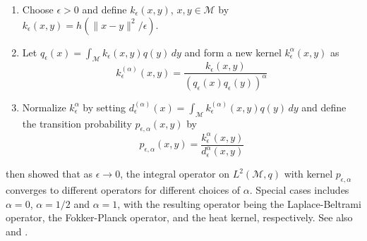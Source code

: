 \begin{enumerate}
\item Choose $\epsilon > 0$ and define $k_{\epsilon}(x,y)$, $x,y
  \in \mathcal{M}$ by $k_{\epsilon}(x,y) = h(\| x - y \|^2/\epsilon)$.
\item Let $q_{\epsilon}(x) = \int_{\mathcal{M}}{k_{\epsilon}(x,y) q(y)
    \,d y}$ and
  form a new kernel $k_{\epsilon}^{\alpha}(x,y)$ as
  \begin{equation}
    \label{eq:95}
    k_{\epsilon}^{(\alpha)}(x,y) =
    \frac{k_{\epsilon}(x,y)}{(q_{\epsilon}(x) q_{\epsilon}(y))^{\alpha}}
  \end{equation}
\item Normalize $k_{\epsilon}^{\alpha}$ by setting
  $d_{\epsilon}^{(\alpha)}(x) = \int_{\mathcal{M}}{k_{\epsilon}^{(\alpha)}(x,y) q(y)
    \, d y}$ and define the transition probability
    $p_{\epsilon,\alpha}(x,y)$ by
    \begin{equation}
      \label{eq:96}
      p_{\epsilon,\alpha}(x,y) = \frac{k_{\epsilon}^{\alpha}(x,y)}{d_{\epsilon}^{\alpha}(x,y)}
    \end{equation}
\end{enumerate}
\citet{coifman06:_diffus_maps} then showed that as $\epsilon
\rightarrow 0$, the integral operator on $L^{2}(\mathcal{M},q)$ with
kernel $p_{\epsilon,\alpha}$ converges to different operators for
different choices of $\alpha$. Special cases includes $\alpha = 0$,
$\alpha = 1/2$ and $\alpha = 1$, with the resulting operator being the
Laplace-Beltrami operator, the Fokker-Planck operator, and the heat
kernel, respectively. See also
\citet{nadler05:_diffus_eigen_fokker_planc_operat} and
\citet{nadler06:_diffus}.

